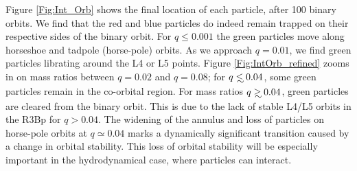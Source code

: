 Figure \ref{Fig:Int_Orb} shows the final location of each particle,
after 100 binary orbits. We find that the red and blue particles do
indeed remain trapped on their respective sides of the binary
orbit. For $q\leq 0.001$ the green particles move along horseshoe and
tadpole (horse-pole) orbits. As we approach $q=0.01$, we find green
particles librating around the L4 or L5 points. Figure
\ref{Fig:IntOrb_refined} zooms in on mass ratios between $q=0.02$ and
$q=0.08$; for $q\lsim 0.04$, some green particles remain in the
co-orbital region. For mass ratios $q \gsim 0.04$, green particles are
cleared from the binary orbit. This is due to the lack of stable L4/L5
orbits in the R3Bp for $q>0.04$. The widening of the annulus and loss
of particles on horse-pole orbits at $q \simeq 0.04$ marks a
dynamically significant transition caused by a change in orbital
stability. This loss of orbital stability will be especially important
in the hydrodynamical case, where particles can interact.








